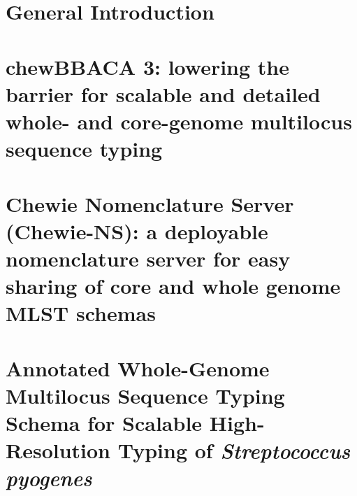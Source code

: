 \documentclass[12pt,a4paper,twoside,openright]{book}
\makeatletter
\def\cleardoublepage{\clearpage\if@twoside \ifodd\c@page\else
    \hbox{}
    \thispagestyle{plain}
    \newpage
    \if@twocolumn\hbox{}\newpage\fi\fi\fi}
\makeatother
\begin{document}
\begin{sloppy}
\newpage
\thispagestyle{plain}
\renewcommand{\contentsname}{Table of Contents}
\tableofcontents
\cleardoublepage
\thispagestyle{plain}
\listoftables
\cleardoublepage
\thispagestyle{plain}
\listoffigures

\mainmatter

\newpage
\thispagestyle{empty}
\chapter{General Introduction\label{ch:introduction}}
\thispagestyle{empty}
\cleardoublepage


\newpage
\thispagestyle{empty}
\chapter{chewBBACA 3: lowering the barrier for scalable and detailed whole- and core-genome multilocus sequence typing\label{ch:paper1}}
\thispagestyle{empty}
\cleardoublepage


\newpage
\thispagestyle{empty}
\chapter{Chewie Nomenclature Server (Chewie-NS): a deployable nomenclature server for easy sharing of core and whole genome MLST schemas\label{ch:paper2}}
\thispagestyle{empty}
\cleardoublepage


\newpage
\thispagestyle{empty}
\chapter{Annotated Whole-Genome Multilocus Sequence Typing Schema for Scalable High-Resolution Typing of \textit{Streptococcus pyogenes}\label{ch:paper3}}
\thispagestyle{empty}
\cleardoublepage



\end{sloppy}
\end{document}
